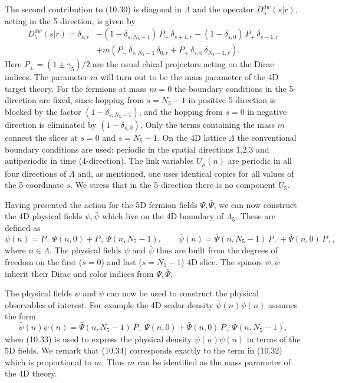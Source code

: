 The second contribution to (10.30) is diagonal in $\Lambda$ and the operator
$D_5^{dw}(s|r)$, acting in the 5-direction, is given by
\begin{equation}
  \begin{split}
    D_5^{dw}(s|r) = \delta_{s,r} &- (1-\delta_{s,N_5-1})\, P_-\, \delta_{s+1,r}
    - (1-\delta_{s,0})\, P_+\, \delta_{s-1,r} \\
    &+ m\left(P_-\,\delta_{s,N_5-1}\,\delta_{0,r}
    + P_+\,\delta_{s,0}\,\delta_{N_5-1,r}\right) .
  \end{split}
\end{equation}
Here $P_\pm = (1\pm\gamma_5)/2$ are the usual chiral projectors acting on the
Dirac indices. The parameter $m$ will turn out to be the mass parameter of the
4D target theory. For the fermions at mass $m = 0$ the boundary conditions in
the 5-direction are fixed, since hopping from $s = N_5 - 1$ in positive
5-direction is blocked by the factor $(1-\delta_{s,N_5-1})$, and the hopping
from $s = 0$ in negative direction is eliminated by $(1-\delta_{s,0})$. Only
the terms containing the mass $m$ connect the slices at $s = 0$ and
$s = N_5 - 1$. On the 4D lattice $\Lambda$ the conventional boundary
conditions are used: periodic in the spatial directions 1,2,3 and antiperiodic
in time (4-direction). The link variables $U_\mu(n)$ are periodic in all four
directions of $\Lambda$ and, as mentioned, one uses identical copies for all
values of the 5-coordinate $s$. We stress that in the 5-direction there is no
component $U_5$.

Having presented the action for the 5D fermion fields $\Psi, \bar\Psi$, we can
now construct the 4D physical fields $\psi, \bar\psi$ which live on the 4D
boundary of $\Lambda_5$. These are defined as
\begin{equation}
  \psi(n) = P_-\,\Psi(n, 0) + P_+\,\Psi(n, N_5 - 1) , \qquad
  \bar\psi(n) = \bar\Psi(n, N_5 - 1)\, P_- + \bar\Psi(n, 0)\, P_+ ,
\end{equation}
where $n \in \Lambda$. The physical fields $\psi$ and $\bar\psi$ thus are built
from the degrees of freedom on the first ($s = 0$) and last
($s = N_5 - 1$) 4D slice. The spinors $\psi, \bar\psi$ inherit their Dirac and
color indices from $\Psi, \bar\Psi$.

The physical fields $\psi$ and $\bar\psi$ can now be used to construct the
physical observables of interest. For example the 4D scalar density
$\bar\psi(n)\psi(n)$ assumes the form
\begin{equation}
  \bar\psi(n)\psi(n) = \bar\Psi(n, N_5 - 1)\, P_-\, \Psi(n, 0)
  + \bar\Psi(n, 0)\, P_+\, \Psi(n, N_5 - 1) ,
\end{equation}
when (10.33) is used to express the physical density $\bar\psi(n)\psi(n)$ in
terms of the 5D fields. We remark that (10.34) corresponds exactly to the term
in (10.32) which is proportional to $m$. Thus $m$ can be identified as the
mass parameter of the 4D theory.

